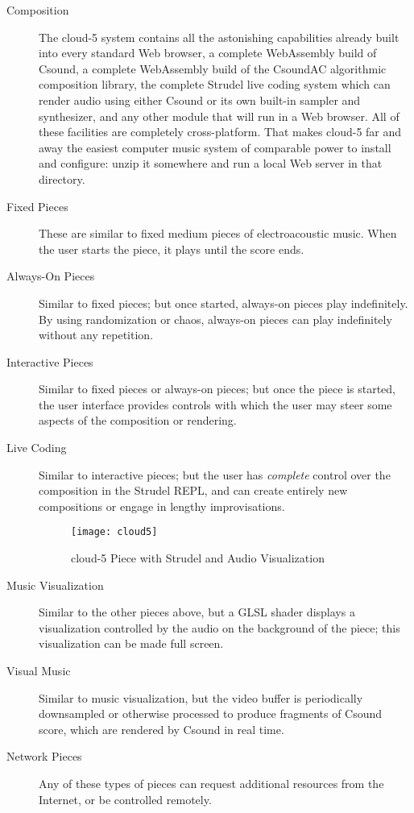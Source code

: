 \documentclass[runningheads,a4paper]{llncs}
\begin{document}
\begin{description}
\item[Composition] The cloud-5 system contains all the astonishing capabilities already built into every standard Web browser, a complete WebAssembly build of Csound, a complete WebAssembly build of the CsoundAC algorithmic composition library, the complete Strudel live coding system which can render audio using either Csound or its own built-in sampler and synthesizer, and any other module that will run in a Web browser. All of these facilities are completely cross-platform. That makes cloud-5 far and away the easiest computer music system of comparable power to install and configure: unzip it somewhere and run a local Web server in that directory. 
\item[Fixed Pieces] These are similar to fixed medium pieces of electroacoustic music. When the user starts the piece, it plays until the score ends. 
\item[Always-On Pieces] Similar to fixed pieces; but once started, always-on pieces play indefinitely. By using randomization or chaos, always-on pieces can play indefinitely without any repetition.
\item[Interactive Pieces] Similar to fixed pieces or always-on pieces; but once the piece is started, the user interface provides controls with which the user may steer some aspects of the composition or rendering.
\item[Live Coding] Similar to interactive pieces; but the user has \emph{complete} control over the composition in the Strudel REPL, and can create entirely new compositions or engage in lengthy improvisations.

\begin{figure}
\centering
\texttt{[image: cloud5]}
\caption{cloud-5 Piece with Strudel and Audio Visualization}
\label{fig:cloud5}
\end{figure}

\item[Music Visualization] Similar to the other pieces above, but a GLSL shader displays a visualization controlled by the audio on the background of the piece; this visualization can be made full screen.
\item[Visual Music] Similar to music visualization, but the video buffer is periodically downsampled or otherwise processed to produce fragments of Csound score, which are rendered by Csound in real time.
\item[Network Pieces] Any of these types of pieces can request additional resources from the Internet, or be controlled remotely.
\end{description}
\end{document}
